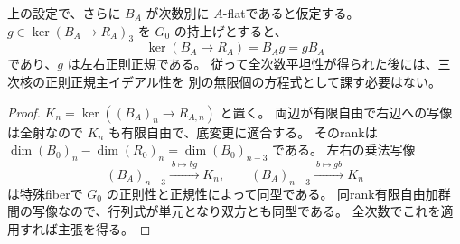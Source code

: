 \begin{lemma}[全次数平坦性の後の三次核]\label{lem:flat-envelope-principal}
上の設定で、さらに $B_A$ が次数別に $A$-flatであると仮定する。
$g\in\ker(B_A\to R_A)_3$ を $G_0$ の持上げとすると、
\[
 \ker(B_A\to R_A)=B_Ag=gB_A
\]
であり、$g$ は左右正則正規である。
従って全次数平坦性が得られた後には、三次核の正則正規主イデアル性を
別の無限個の方程式として課す必要はない。
\end{lemma}
\begin{proof}
$K_n=\ker((B_A)_n\to R_{A,n})$ と置く。
両辺が有限自由で右辺への写像は全射なので $K_n$ も有限自由で、底変更に適合する。
そのrankは $\dim(B_0)_n-\dim(R_0)_n=\dim(B_0)_{n-3}$ である。
左右の乗法写像
\[
 (B_A)_{n-3}\xrightarrow{\ b\mapsto bg\ } K_n,
 \qquad
 (B_A)_{n-3}\xrightarrow{\ b\mapsto gb\ } K_n
\]
は特殊fiberで $G_0$ の正則性と正規性によって同型である。
同rank有限自由加群間の写像なので、行列式が単元となり双方とも同型である。
全次数でこれを適用すれば主張を得る。
\end{proof}

